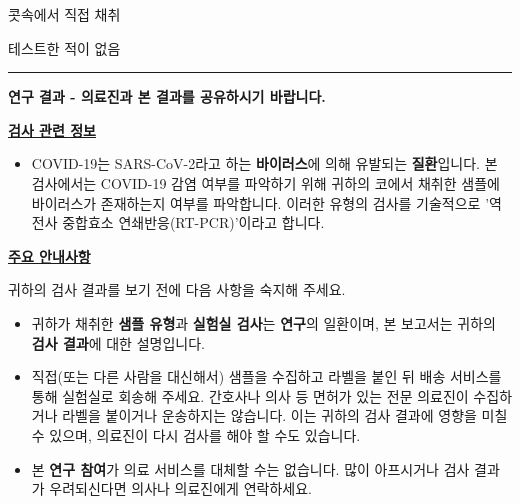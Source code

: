 \documentclass[10pt]{article}
\newcommand{\PageLine}{\rule{\textwidth}{0.25mm}}
\begin{document}
\begin{description}[font=\normalfont,align=left,labelwidth=8em]
\item [\textbf{\VAR{pat_name|e}}]
\item [\textbf{생년월일:}] 
\item [\textbf{검체:}] 콧속에서 직접 채취
\item [\textbf{채취 검체 바코드:}] 
\item [\textbf{채취일:}] 
\item [\textbf{보고일:}]
  테스트한 적이 없음
\end{description}

\PageLine

\begin{center}
\Large
\textbf{연구 결과 - 의료진과 본 결과를 공유하시기 바랍니다.}
\end{center}

\bigskip

\large \underline{\textbf{검사 관련 정보}}

\begin{itemize}
\item

  COVID-19는 SARS-CoV-2라고 하는 \textbf{바이러스}에 의해 유발되는 \textbf{질환}입니다. 본
  검사에서는 COVID-19 감염 여부를 파악하기 위해 귀하의 코에서 채취한 샘플에 바이러스가
  존재하는지 여부를 파악합니다. 이러한 유형의 검사를 기술적으로 '역전사 중합효소
  연쇄반응(RT-PCR)'이라고 합니다.

\end{itemize}

\bigskip

\large \underline{\textbf{주요 안내사항}}

귀하의 검사 결과를 보기 전에 다음 사항을 숙지해 주세요.

\begin{itemize}
\item

  귀하가 채취한 \textbf{샘플 유형}과 \textbf{실험실 검사}는 \textbf{연구}의 일환이며, 본
  보고서는 귀하의 \textbf{검사 결과}에 대한 설명입니다.

\item

  직접(또는 다른 사람을 대신해서) 샘플을 수집하고 라벨을 붙인 뒤 배송 서비스를 통해 실험실로 회송해
  주세요. 간호사나 의사 등 면허가 있는 전문 의료진이 수집하거나 라벨을 붙이거나 운송하지는
  않습니다. 이는 귀하의 검사 결과에 영향을 미칠 수 있으며, 의료진이 다시 검사를 해야 할 수도
  있습니다.

\item

  본 \textbf{연구 참여}가 의료 서비스를 대체할 수는 없습니다. 많이 아프시거나 검사 결과가
  우려되신다면 의사나 의료진에게 연락하세요.

\end{itemize}
\end{document}

